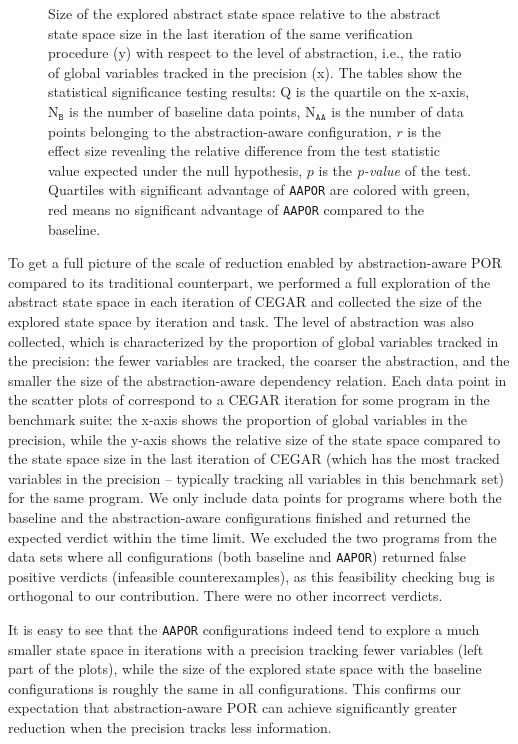 \documentclass[numbook]{svjour3}
\begin{document}
\begin{description}
\begin{figure}[t]
    	\caption{Size of the explored abstract state space relative to the abstract state space size in the last iteration of the same verification procedure (y) with respect to the level of abstraction, i.e., the ratio of global variables tracked in the precision (x). The tables show the statistical significance testing results: Q is the quartile on the x-axis, N$_\texttt{B}$ is the number of baseline data points, N$_\texttt{AA}$ is the number of data points belonging to the abstraction-aware configuration, $r$ is the effect size revealing the relative difference from the test statistic value expected under the null hypothesis, $p$ is the \emph{p-value} of the test. Quartiles with significant advantage of \texttt{AAPOR} are colored with green, red means no significant advantage of \texttt{AAPOR} compared to the baseline.}
    	\label{fig:state-space-relative-size}
    \end{figure}
    
    To get a full picture of the scale of reduction enabled by abstraction-aware POR compared to its traditional counterpart, we performed a full exploration of the abstract state space in each iteration of CEGAR and collected the size of the explored state space by iteration and task. The level of abstraction was also collected, which is characterized by the proportion of global variables tracked in the precision: the fewer variables are tracked, the coarser the abstraction, and the smaller the size of the abstraction-aware dependency relation. Each data point in the scatter plots of  correspond to a CEGAR iteration for some program in the benchmark suite: the x-axis shows the proportion of global variables in the precision, while the y-axis shows the relative size of the state space compared to the state space size in the last iteration of CEGAR (which has the most tracked variables in the precision -- typically tracking all variables in this benchmark set) for the same program. We only include data points for programs where both the baseline and the abstraction-aware configurations finished and returned the expected verdict within the time limit. We excluded the two programs from the data sets where all configurations (both baseline and \texttt{AAPOR}) returned false positive verdicts (infeasible counterexamples), as this feasibility checking bug is orthogonal to our contribution. There were no other incorrect verdicts.

    It is easy to see that the \texttt{AAPOR} configurations indeed tend to explore a much smaller state space in iterations with a precision tracking fewer variables (left part of the plots), while the size of the explored state space with the baseline configurations is roughly the same in all configurations. This confirms our expectation that abstraction-aware POR can achieve significantly greater reduction when the precision tracks less information.
    

\end{description}
\end{document}
